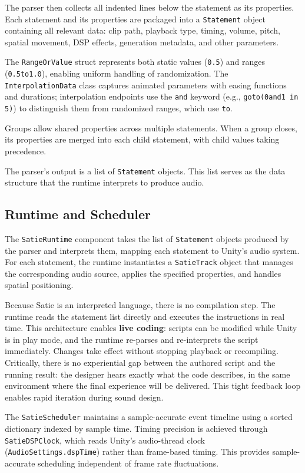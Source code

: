 \documentclass[sigconf,anonymous,review]{nimeart}
\begin{document}
The parser then collects all indented lines below the statement as its properties. Each statement and its properties are packaged into a \texttt{Statement} object containing all relevant data: clip path, playback type, timing, volume, pitch, spatial movement, DSP effects, generation metadata, and other parameters.

The \texttt{RangeOrValue} struct represents both static values (\texttt{0.5}) and ranges (\texttt{0.5to1.0}), enabling uniform handling of randomization. The \texttt{InterpolationData} class captures animated parameters with easing functions and durations; interpolation endpoints use the \texttt{and} keyword (e.g., \texttt{goto(0and1 in 5)}) to distinguish them from randomized ranges, which use \texttt{to}.

Groups allow shared properties across multiple statements. When a group closes, its properties are merged into each child statement, with child values taking precedence.

The parser's output is a list of \texttt{Statement} objects. This list serves as the data structure that the runtime interprets to produce audio.

\subsection{Runtime and Scheduler}

The \texttt{SatieRuntime} component takes the list of \texttt{Statement} objects produced by the parser and interprets them, mapping each statement to Unity's audio system. For each statement, the runtime instantiates a \texttt{SatieTrack} object that manages the corresponding audio source, applies the specified properties, and handles spatial positioning.

Because Satie is an interpreted language, there is no compilation step. The runtime reads the statement list directly and executes the instructions in real time. This architecture enables \textbf{live coding}: scripts can be modified while Unity is in play mode, and the runtime re-parses and re-interprets the script immediately. Changes take effect without stopping playback or recompiling. Critically, there is no experiential gap between the authored script and the running result: the designer hears exactly what the code describes, in the same environment where the final experience will be delivered. This tight feedback loop enables rapid iteration during sound design.

The \texttt{SatieScheduler} maintains a sample-accurate event timeline using a sorted dictionary indexed by sample time. Timing precision is achieved through \texttt{SatieDSPClock}, which reads Unity's audio-thread clock (\texttt{AudioSettings.\allowbreak{}dspTime}) rather than frame-based timing. This provides sample-accurate scheduling independent of frame rate fluctuations.
\end{document}
